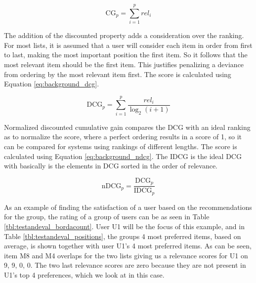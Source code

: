 \begin{equation}\label{eq:background_cg}
	\text{CG}_p = \sum_{i=1}^{p}\textit{rel}_i
\end{equation}

The addition of the discounted property adds a consideration over the ranking. For most lists, it is assumed that a user will consider each item in order from first to last, making the most important position the first item. So it follows that the most relevant item should be the first item. This justifies penalizing a deviance from ordering by the most relevant item first. The score is calculated using Equation \ref{eq:background_dcg}.

\begin{equation}\label{eq:background_dcg}
	\text{DCG}_p = \sum_{i=1}^{p}\frac{\textit{rel}_i}{\log_2(i + 1)}
\end{equation}

Normalized discounted cumulative gain compares the DCG with an ideal ranking as to normalize the score, where a perfect ordering results in a score of 1, so it can be compared for systems using rankings of different lengths. The score is calculated using Equation \ref{eq:background_ndcg}. The IDCG is the ideal DCG with basically is the elements in DCG sorted in the order of relevance.


\begin{equation}\label{eq:background_ndcg}
	\text{nDCG}_p = \frac{\text{DCG}_p}{\text{IDCG}_p}
\end{equation}


As an example of finding the satisfaction of a user based on the recommendations for the group, the rating of a group of users can be as seen in Table \ref{tbl:testandeval_bordacount}. User U1 will be the focus of this example, and in Table \ref{tbl:testandeval_positions}, the groups 4 most preferred items, based on average, is shown together with user U1's 4 most preferred items. As can be seen, item M8 and M4 overlaps for the two lists giving us a relevance scores for U1 on 9, 9, 0, 0. The two last relevance scores are zero because they are not present in U1's top 4 preferences, which we look at in this case.

